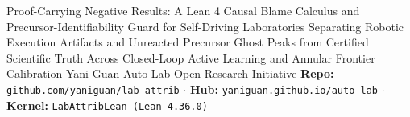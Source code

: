 \documentclass[10pt,letterpaper]{article}
\begin{document}
\makelabattribtitle
  {Proof-Carrying Negative Results: A Lean 4 Causal Blame Calculus and Precursor-Identifiability Guard for Self-Driving Laboratories}
  {Separating Robotic Execution Artifacts and Unreacted Precursor Ghost Peaks from Certified Scientific Truth Across Closed-Loop Active Learning and Annular Frontier Calibration}
  {Yani Guan}
  {Auto-Lab Open Research Initiative}
  {\textcolor{accentdeep}{\textbf{Repo:}} \href{https://github.com/yaniguan/lab-attrib}{\texttt{github.com/yaniguan/lab-attrib}} \;\;$\cdot$\;\; \textcolor{accentdeep}{\textbf{Hub:}} \href{https://yaniguan.github.io/auto-lab/}{\texttt{yaniguan.github.io/auto-lab}} \;\;$\cdot$\;\; \textcolor{accentdeep}{\textbf{Kernel:}} \texttt{LabAttribLean (Lean 4.36.0)}}
\end{document}
